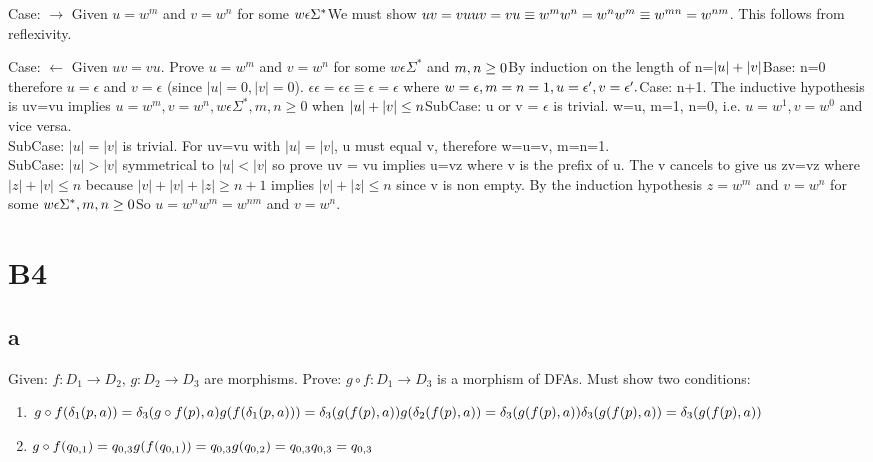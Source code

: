 \documentclass[12pt]{article}
\begin{document}
Case: $\rightarrow $ 
Given $u=w^m $ and $ v= w^n$ for some $w \epsilon \Sigma^{\ast}  \\
$We must show $ uv =vu \\
uv =vu \equiv w^m w^n = w^n w^m \equiv w^{mn} = w^{nm} $. This follows from reflexivity.  

Case: $\leftarrow $ 
Given $uv=vu$. Prove $u= w^m$ and $v=w^n$ for some $w \epsilon \Sigma^{\ast} $ and $ m,n \ge 0 \\
$By induction on the length of n=$|u|+|v| \\
$Base: n=0 therefore $u= \epsilon$ and $v= \epsilon$ (since $|u|=0,|v|=0$). $ \epsilon \epsilon = \epsilon \epsilon \equiv \epsilon = \epsilon$ where $w= \epsilon , m=n=1, u= \epsilon ' , v= \epsilon '. \\
$Case: n+1. The inductive hypothesis is uv=vu implies $u=w^m,v=w^n,w \epsilon \Sigma^\ast , m,n \ge 0$ when $|u| +|v| \le n \\
$SubCase: u or v = $ \epsilon $ is trivial. w=u, m=1, n=0, i.e. $u=w^1,v=w^0$ and vice versa. \\
SubCase: $|u|=|v|$ is trivial. For uv=vu with $|u|=|v|$, u must equal v, therefore w=u=v, m=n=1. \\
SubCase: $|u| > |v|$ symmetrical to $|u|<|v|$ so prove uv = vu implies u=vz where v is the prefix of u. The v cancels to give us zv=vz where $|z|+|v| \le n$ because $|v|+|v|+|z| \ge n+1$ implies $|v|+|z| \le n$ since v is non empty.  By the induction hypothesis $z=w^m$ and $v=w^n$ for some $w \epsilon \Sigma^\ast , m,n \ge 0 \\
$So $u=w^n w^m = w^{nm}$ and $v = w^n$. 

\section*{B4}
\subsection*{a}
Given: $f: D_1 \rightarrow D_2$, $ g: D_2 \rightarrow D_3$ are morphisms. 
Prove: $g \circ f: D_1 \rightarrow D_3$ is a morphism of DFAs.
Must show two conditions:
\begin{enumerate}
	\item
	$g \circ f( \delta_1(p,a))= \delta_3(g \circ f(p),a) \\
	g (f( \delta_1(p,a)))= \delta_3(g(f(p),a)) \\
	g (\delta_2(f(p),a))= \delta_3(g(f(p),a)) \\
        \delta_3(g(f(p),a))= \delta_3(g(f(p),a)) \\ $
	\item
        $ g \circ f (q_{0,1})=q_{0,3} \\
        g (f (q_{0,1}))=q_{0,3} \\
        g (q_{0,2})=q_{0,3} \\
        q_{0,3}=q_{0,3} \\ $
\end{enumerate}
\end{document}

